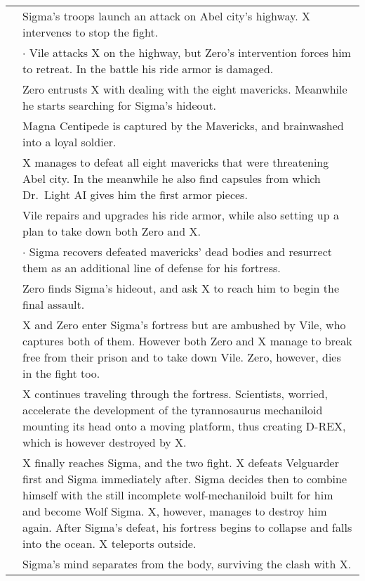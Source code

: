 \begin{tabularx}{\linewidth}{l X}
	\addlinespace[1.5ex]
	\tabdot& Sigma's troops launch an attack on Abel city's highway. X intervenes to stop the fight.\\
	\tabline& $\cdot$ Vile attacks X on the highway, but Zero's intervention forces him to retreat. In the battle his ride armor is damaged.\\
	\tabdot& Zero entrusts X with dealing with the eight mavericks. Meanwhile he starts searching for Sigma's hideout.\\
	\tabdot& Magna Centipede is captured by the Mavericks, and brainwashed into a loyal soldier.\\
	\tabdot& X manages to defeat all eight mavericks that were threatening Abel city. In the meanwhile he also find capsules from which Dr.~Light AI gives him the first armor pieces.\\
	\timemoment{Gravity Beetle swears revenge against X for his brother's (Boomer Kuwanger) death.}
	\tabdot& Vile repairs and upgrades his ride armor, while also setting up a plan to take down both Zero and X.\\
	\tabline& $\cdot$ Sigma recovers defeated mavericks' dead bodies and resurrect them as an additional line of defense for his fortress.\\
	\tabdot& Zero finds Sigma's hideout, and ask X to reach him to begin the final assault.\\
	\tabdot& X and Zero enter Sigma's fortress but are ambushed by Vile, who captures both of them. However both Zero and X manage to break free from their prison and to take down Vile. Zero, however, dies in the fight too.\\
	\tabdot& X continues traveling through the fortress. Scientists, worried, accelerate the development of the tyrannosaurus mechaniloid mounting its head onto a moving platform, thus creating D-REX, which is however destroyed by X.\\
	\tabdot& X finally reaches Sigma, and the two fight. X defeats Velguarder first and Sigma immediately after. Sigma decides then to combine himself with the still incomplete wolf-mechaniloid built for him and become Wolf Sigma. X, however, manages to destroy him again. After Sigma's defeat, his fortress begins to collapse and falls into the ocean. X teleports outside.\\
	\tabdot& Sigma's mind separates from the body, surviving the clash with X.\\
	\midrule
	

\end{tabularx}
